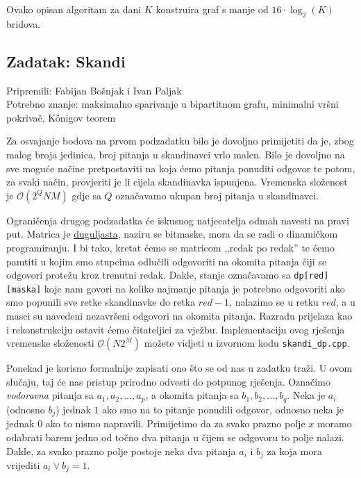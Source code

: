 \documentclass[a4paper]{article}
\begin{document}
Ovako opisan algoritam za dani $K$ konstruira graf s manje od $16 \cdot
\log_2(K)$ bridova.

\subsection*{Zadatak: Skandi}
\textsf{Pripremili: Fabijan Bošnjak i Ivan Paljak}\\
\textsf{Potrebno znanje: maksimalno sparivanje u bipartitnom grafu, minimalni
vršni pokrivač, K\"{o}nigov teorem}

Za osvajanje bodova na prvom podzadatku bilo je dovoljno primijetiti da je,
zbog malog broja jedinica, broj pitanja u skandinavci vrlo malen. Bilo je
dovoljno na sve moguće načine pretpostaviti na koja ćemo pitanja ponuditi
odgovor te potom, za svaki način, provjeriti je li cijela skandinavka ispunjena.
Vremenska složenost je $\mathcal{O}(2^QNM)$ gdje sa $Q$ označavamo ukupan broj
pitanja u skandinavci.

Ograničenja drugog podzadatka će iskusnog natjecatelja odmah navesti na pravi
put. Matrica je
\href{https://blogaritam.com/2018/09/10/tema-dana-duguljaste-matrice/}{duguljasta},
naziru se bitmaske, mora da se radi o dinamičkom programiranju. I bi tako,
kretat ćemo se matricom ,,redak po redak'' te ćemo pamtiti u kojim smo stupcima
odlučili odgovoriti na okomita pitanja čiji se odgovori protežu kroz trenutni
redak.  Dakle, stanje označavamo sa \texttt{dp[red][maska]} koje nam govori na
koliko najmanje pitanja je potrebno odgovoriti ako smo popunili sve retke
skandinavke do retka $red - 1$, nalazimo se u retku $red$, a u masci su
navedeni nezavršeni odgovori na okomita pitanja. Razradu prijelaza kao i
rekonstrukciju ostavit ćemo čitateljici za vježbu. Implementaciju ovog rješenja
vremenske složenosti $\mathcal{O}(N2^M)$ možete vidjeti u izvornom kodu
\texttt{skandi\_dp.cpp}.

Ponekad je korisno formalnije zapisati ono što se od nas u zadatku traži. U
ovom slučaju, taj će nas pristup prirodno odvesti do potpunog rješenja.
Označimo \textit{vodoravna} pitanja sa $a_1, a_2, \dots, a_p$, a okomita
pitanja sa $b_1, b_2, \dots, b_q$. Neka je $a_i$ (odnosno $b_j$) jednak $1$ ako
smo na to pitanje ponudili odgovor, odnosno neka je jednak $0$ ako to nismo
napravili. Primijetimo da za svako prazno polje $x$ moramo odabrati barem jedno
od točno dva pitanja u čijem se odgovoru to polje nalazi. Dakle, za svako
prazno polje postoje neka dva pitanja $a_i$ i $b_j$ za koja mora vrijediti $a_i
\lor b_j = 1$.
\end{document}
